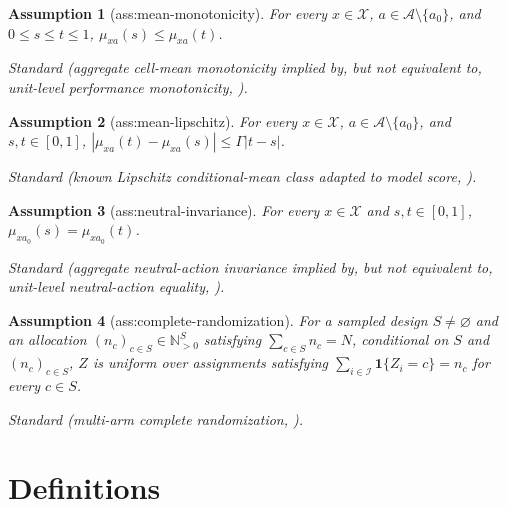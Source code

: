 \documentclass{article}
\newtheorem{assumption}{Assumption}
\begin{document}
\begin{assumption}[ass:mean-monotonicity]\label{ass:mean-monotonicity}
For every \(x\in\mathcal X\), \(a\in\mathcal A\setminus\{a_0\}\), and \(0\leq s\leq t\leq1\), \(\mu_{xa}(s)\leq\mu_{xa}(t)\).
\par\smallskip\noindent\emph{Standard} (aggregate cell-mean monotonicity implied by, but not equivalent to, unit-level performance monotonicity, \cite{ChenOberst2025}).
\end{assumption}

\begin{assumption}[ass:mean-lipschitz]\label{ass:mean-lipschitz}
For every \(x\in\mathcal X\), \(a\in\mathcal A\setminus\{a_0\}\), and \(s,t\in[0,1]\), \( |\mu_{xa}(t)-\mu_{xa}(s)|\leq\Gamma|t-s|\).
\par\smallskip\noindent\emph{Standard} (known Lipschitz conditional-mean class adapted to model score, \cite{ArmstrongKolesar2021}).
\end{assumption}

\begin{assumption}[ass:neutral-invariance]\label{ass:neutral-invariance}
For every \(x\in\mathcal X\) and \(s,t\in[0,1]\), \(\mu_{x a_0}(s)=\mu_{x a_0}(t)\).
\par\smallskip\noindent\emph{Standard} (aggregate neutral-action invariance implied by, but not equivalent to, unit-level neutral-action equality, \cite{ChenOberst2025}).
\end{assumption}

\begin{assumption}[ass:complete-randomization]\label{ass:complete-randomization}
For a sampled design \(S\neq\varnothing\) and an allocation \((n_c)_{c\in S}\in\mathbb N_{>0}^{S}\) satisfying \(\sum_{c\in S}n_c=N\), conditional on \(S\) and \((n_c)_{c\in S}\), \(Z\) is uniform over assignments satisfying \(\sum_{i\in\mathcal I}\mathbf1\{Z_i=c\}=n_c\) for every \(c\in S\).
\par\smallskip\noindent\emph{Standard} (multi-arm complete randomization, \cite{CaugheyDafoeLiMiratrix2023}).
\end{assumption}

\section{Definitions}
\end{document}
